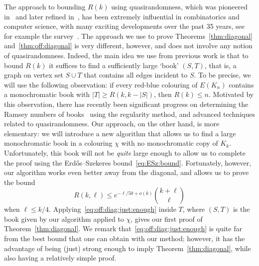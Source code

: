 \documentclass[12pt,reqno]{amsart}
\theoremstyle{definition}
\theoremstyle{remark}
\renewcommand{\le}{\leqslant}
\renewcommand{\ge}{\geqslant}
\begin{document}
The approach to bounding $R(k)$ using quasirandomness, which was pioneered in~\cite{T88} and later refined in~\cite{C09,S23}, has been extremely influential in combinatorics and computer science, with many exciting developments over the past 35 years, see for example the survey~\cite{KS}. The approach we use to prove Theorems~\ref{thm:diagonal} and~\ref{thm:off:diagonal} is very different, however, and does not involve any notion of quasirandomness. Indeed, the main idea we use from previous work is that to bound $R(k)$ it suffices to find a sufficiently large `book' $(S,T)$, that is, a graph on vertex set $S \cup T$ that contains all edges incident to $S$. To be precise, we will use the following observation: if every red-blue colouring of $E(K_n)$ contains a monochromatic book with $|T| \ge R(k,k - |S|)$, then $R(k) \le n$. Motivated by this observation, there has recently been significant progress on determining the Ramsey numbers of books~\cite{C19,CFW22,CFW23} using the regularity method, and advanced techniques related to quasirandomness. Our approach, on the other hand, is more elementary: 
we will introduce a new algorithm that allows us to find a large monochromatic book in a colouring $\chi$ with no monochromatic copy of $K_k$. Unfortunately, this book will not be \emph{quite} large enough to allow us to complete the proof using the Erd\H{o}s--Szekeres bound~\eqref{eq:ESz:bound}. Fortunately, however, our algorithm works even better away from the diagonal, and allows us to prove the bound 
\begin{equation}\label{eq:off:diag:just:enough}
R(k,\ell) \le e^{-\ell/50 + o(k)} {k + \ell \choose \ell}
\end{equation}
when $\ell \le k/4$. Applying~\eqref{eq:off:diag:just:enough} inside $T$, where $(S,T)$ is the book given by our algorithm applied to $\chi$, gives our first proof of Theorem~\ref{thm:diagonal}. We remark that~\eqref{eq:off:diag:just:enough} is quite far from the best bound that one can obtain with our method; however, it has the advantage of being (just) strong enough to imply Theorem~\ref{thm:diagonal}, while also having a relatively simple proof. 
\end{document}
